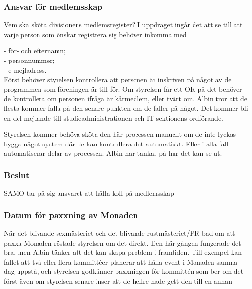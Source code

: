 \documentclass[protokoll]{dvd}
\begin{document}
\subsubsection{Ansvar för medlemsskap}

Vem ska sköta divisionens medlemsregister? I uppdraget ingår det att se till att varje person som önskar registrera sig behöver inkomma med

- för- och efternamn; \\
- personnummer; \\
- e-mejladress. \\

Först behöver styrelsen kontrollera att personen är inskriven på något av de programmen som föreningen är till för. Om styrelsen får ett OK på det behöver de kontrollera om personen ifråga är kårmedlem, eller tvärt om. Albin tror att de flesta kommer falla på den senare punkten om de faller på något. Det kommer bli en del mejlande till studieadministrationen och IT-sektionens ordförande.

Styrelsen kommer behöva sköta den här processen manuellt om de inte lyckas bygga något system där de kan kontrollera det automatiskt. Eller i alla fall automatiserar delar av processen. Albin har tankar på hur det kan se ut.


\subsubsection*{Beslut}

\begin{attsatser}
    \item SAMO tar på sig ansvaret att hålla koll på medlemsskap
\end{attsatser}




\subsubsection{Datum för paxxning av Monaden}

När det blivande sexmästeriet och det blivande rustmästeriet/PR bad om att paxxa Monaden röstade styrelsen om det direkt. Den här gången fungerade det bra, men Albin tänker att det kan skapa problem i framtiden. Till exempel kan fallet att två eller flera kommittéer planerar att hålla event i Monaden samma dag uppstå, och styrelsen godkänner paxxningen för kommittén som ber om det först även om styrelsen senare inser att de hellre hade gett den till en annan.
\end{document}
